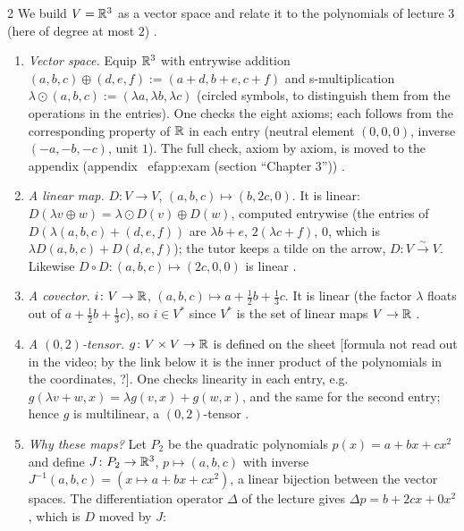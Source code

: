 \begin{paracol}{2}
We build $V=\mathbb{R}^3$ as a vector space and relate it to the polynomials of lecture 3 (here of degree at most $2$) .
\begin{enumerate}
  \item \emph{Vector space.} Equip $\mathbb{R}^3$ with entrywise addition $(a,b,c)\oplus(d,e,f):=(a+d,b+e,c+f)$ and s-multiplication $\lambda\odot(a,b,c):=(\lambda a,\lambda b,\lambda c)$ (circled symbols, to distinguish them from the operations in the entries). One checks the eight axioms;
        each follows from the corresponding property of $\mathbb{R}$ in each entry (neutral element $(0,0,0)$, inverse $(-a,-b,-c)$, unit $1$). The full check, axiom by axiom, is moved to the appendix (appendix~
ef{app:exam} (section ``Chapter 3'')) .
  \item \emph{A linear map.} $D\colon V\to V$, $(a,b,c)\mapsto(b,2c,0)$. It is linear: $D(\lambda v\oplus w)=\lambda\odot D(v)\oplus D(w)$, computed entrywise (the entries of $D(\lambda(a,b,c)+(d,e,f))$ are $\lambda b+e$, $2(\lambda c+f)$, $0$, which is $\lambda D(a,b,c)+D(d,e,f)$); the tutor keeps a tilde on the arrow,
        $D\colon V\xrightarrow{\sim}V$. Likewise $D\circ D\colon(a,b,c)\mapsto(2c,0,0)$ is linear .
  \item \emph{A covector.} $i\colon V\to\mathbb{R}$, $(a,b,c)\mapsto a+\tfrac12b+\tfrac13c$. It is linear (the factor $\lambda$ floats out of $a+\tfrac12b+\tfrac13c$), so $i\in V^*$ since $V^*$ is the set of linear maps $V\to\mathbb{R}$ .
  \item \emph{A $(0,2)$-tensor.} $g\colon V\times V\to\mathbb{R}$ is defined on the sheet [formula not read out in the video; by the link below it is the inner product of the polynomials in the coordinates, ?]. One checks linearity in each entry, e.g.\ $g(\lambda v+w,x)=\lambda g(v,x)+g(w,x)$, and the same for the second entry; hence $g$ is multilinear,
        a $(0,2)$-tensor .
  \item \emph{Why these maps?} Let $P_2$ be the quadratic polynomials $p(x)=a+bx+cx^2$ and define $J\colon P_2\to\mathbb{R}^3$, $p\mapsto(a,b,c)$ with inverse $J^{-1}(a,b,c)=(x\mapsto a+bx+cx^2)$, a linear bijection between the vector spaces. The differentiation operator $\Delta$ of the lecture gives $\Delta p=b+2cx+0x^2$, which is $D$ moved by $J$:

\end{enumerate}
\end{paracol}
